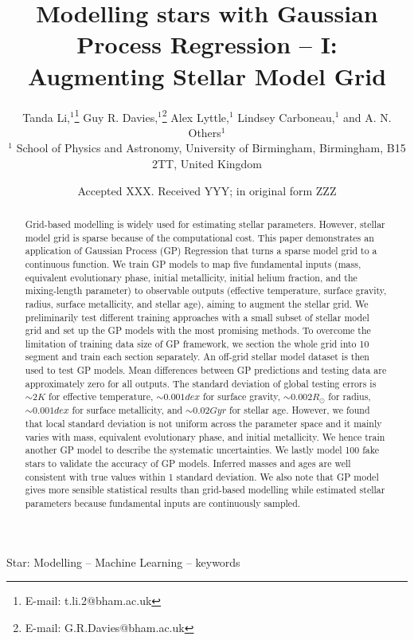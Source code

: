 \documentclass[fleqn,usenatbib]{mnras}
\title[Modelling stars with GP]{Modelling stars with Gaussian Process Regression -- I:  Augmenting Stellar Model Grid}
\author[T. Li et al.]{
Tanda Li,$^{1}$\thanks{E-mail: t.li.2@bham.ac.uk}
Guy R. Davies,$^{1}$\thanks{E-mail: G.R.Davies@bham.ac.uk}
Alex Lyttle,$^{1}$
Lindsey Carboneau,$^{1}$
and A. N. Others$^{1}$
\\
$^{1}$ School of Physics and Astronomy, University of Birmingham, Birmingham, B15 2TT, United Kingdom\\
}
\date{Accepted XXX. Received YYY; in original form ZZZ}
\begin{document}
\label{firstpage}
\pagerange{\pageref{firstpage}--\pageref{lastpage}}
\maketitle

\begin{abstract}
Grid-based modelling is widely used for estimating stellar parameters. However, stellar model grid is sparse because of the computational cost. This paper demonstrates an application of Gaussian Process (GP) Regression that turns a sparse model grid to a continuous function. We train GP models to map five fundamental inputs (mass, equivalent evolutionary phase, initial metallicity, initial helium fraction, and the mixing-length parameter) to observable outputs (effective temperature, surface gravity, radius, surface metallicity, and stellar age), aiming to augment the stellar grid. 
%
We preliminarily test different training approaches with a small subset of stellar model grid and set up the GP models with the most promising methods. To overcome the limitation of training data size of GP framework, we section the whole grid into 10 segment and train each section separately. 
%
An off-grid stellar model dataset is then used to test GP models. Mean differences between GP predictions and testing data are approximately zero for all outputs. The standard deviation of global testing errors is $\sim 2 K$ for effective temperature, $\sim 0.001 dex$ for surface gravity, $\sim 0.002 R_{\odot}$ for radius, $\sim 0.001 dex$ for surface metallicity, and $\sim 0.02 Gyr$ for stellar age. However, we found that local standard deviation is not uniform across the parameter space and it mainly varies with mass, equivalent evolutionary phase, and initial metallicity. We hence train another GP model to describe the systematic uncertainties.      
%
We lastly model 100 fake stars to validate the accuracy of GP models. Inferred masses and ages are well consistent with true values within 1 standard deviation. We also note that GP model gives more sensible statistical results than grid-based modelling while estimated stellar parameters because fundamental inputs are continuously sampled. 
%
\end{abstract}

\begin{keywords}
Star: Modelling -- Machine Learning -- keywords
\end{keywords}
\end{document}
